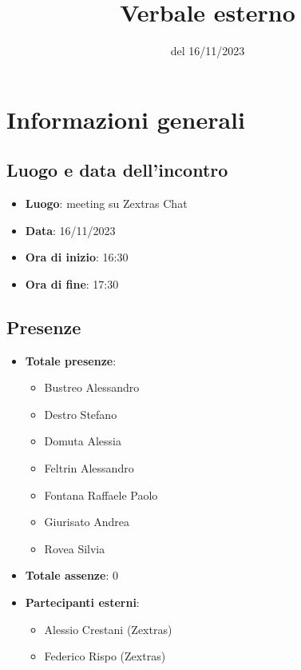 \documentclass[12pt]{article}
\title{Verbale esterno}
\date{del 16/11/2023}
\begin{document}
	\makefirstpage
	
	
	\clearpage
	
	\tableofcontents
	\clearpage

    \section{Informazioni generali}
    
    \subsection{Luogo e data dell'incontro}
    
    \begin{itemize}
    	\item \textbf{Luogo}: meeting su Zextras Chat
    	\item \textbf{Data}: 16/11/2023
    	\item \textbf{Ora di inizio}: 16:30
    	\item \textbf{Ora di fine}: 17:30
    \end{itemize}
    
    \subsection{Presenze}
    
    \begin{itemize}
    	\item \textbf{Totale presenze}:
    	\begin{itemize}
    		\item Bustreo Alessandro
    		\item Destro Stefano
    		\item Domuta Alessia 
    		\item Feltrin Alessandro 
    		\item Fontana Raffaele Paolo 
    		\item Giurisato Andrea 
    		\item Rovea Silvia
    	\end{itemize}
    	
    	\item \textbf{Totale assenze}: 0
    	
    	\item \textbf{Partecipanti esterni}:
    	\begin{itemize}
    		\item Alessio Crestani (Zextras)
            \item Federico Rispo (Zextras)
    	\end{itemize}
    \end{itemize}
    
\end{document}
